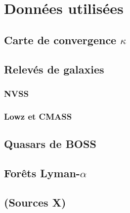 
\chapter{Données utilisées} %

\label{Chapter6} %


\section{Carte de convergence $\kappa$}

\section{Relevés de galaxies}
\subsection{NVSS}
\subsection{Lowz et CMASS}
\section{Quasars de BOSS}
\section{Forêts Lyman-$\alpha$}
\section{(Sources X)}
